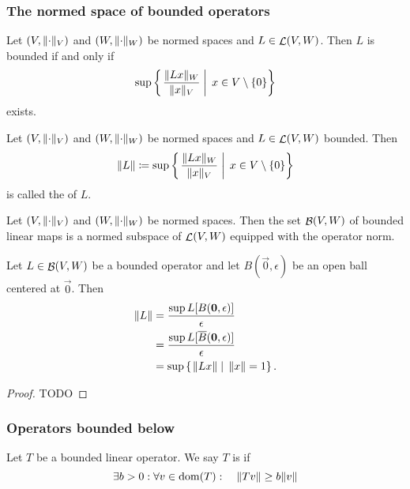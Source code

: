 \subsubsection{The normed space of bounded operators}
\begin{lemma} \label{lemma:operatorNorm}
Let $(V,\lVert\cdot\rVert_V)$ and $(W,\lVert\cdot\rVert_W)$ be normed spaces and $L\in\mathop{\mathcal{L}}(V, W)$. Then $L$ is bounded \textup{if and only if}
\[ \sup\left\{\left. \frac{\lVert Lx\rVert_W}{\lVert x\rVert_V} \;\right|\; x\in V\setminus\{0\} \right\} \] 
exists.
\end{lemma}
\begin{definition}
Let $(V,\lVert\cdot\rVert_V)$ and $(W,\lVert\cdot\rVert_W)$ be normed spaces and $L\in\mathop{\mathcal{L}}(V, W)$ bounded. Then
\[ \lVert L\rVert \coloneqq \sup\left\{\left. \frac{\lVert Lx\rVert_W}{\lVert x\rVert_V} \;\right|\; x\in V\setminus\{0\} \right\} \]
is called the  of $L$.
\end{definition}

\begin{proposition} \label{prop:BoundedSpace}
Let $(V,\lVert\cdot\rVert_V)$ and $(W,\lVert\cdot\rVert_W)$ be normed spaces. Then the set $\mathop{\mathcal{B}}(V,W)$ of bounded linear maps is a normed subspace of $\mathop{\mathcal{L}}(V,W)$ equipped with the operator norm.
\end{proposition}

\begin{proposition} \label{prop:operatorNorm}
Let $L\in\mathop{\mathcal{B}}(V,W)$ be a bounded operator and let $B(\vec{0},\epsilon)$ be an open ball centered at $\vec{0}$. Then
\begin{align*}
\lVert L\rVert &= \frac{\sup L[B(\bm{\mathrm{0}},\epsilon)]}{\epsilon} \\
&= \frac{\sup L[\overline{B}(\bm{\mathrm{0}},\epsilon)]}{\epsilon} \\
&= \sup\left\{\left. \lVert Lx\rVert \;\right|\; \lVert x\rVert = 1 \right\}.
\end{align*}
\end{proposition}
\begin{proof}
TODO
\end{proof}

\subsubsection{Operators bounded below}
\begin{definition}
Let $T$ be a bounded linear operator. We say $T$ is  if
\[ \exists b>0:\forall v\in \operatorname{dom}(T): \quad \lVert Tv\rVert\geq b\lVert v\rVert \]
\end{definition}


